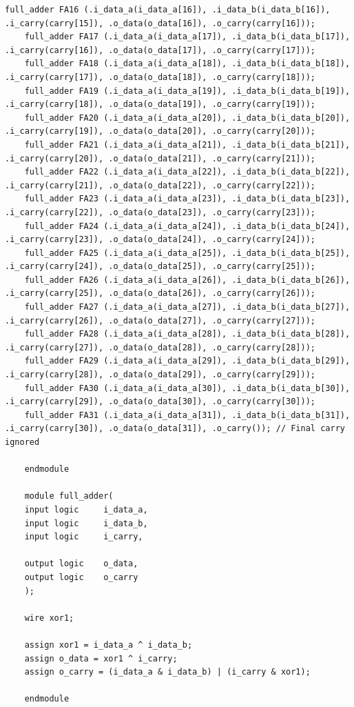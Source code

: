 \begin{lstlisting}[style = SystemVerilog, caption={RCA}]
	full_adder FA16 (.i_data_a(i_data_a[16]), .i_data_b(i_data_b[16]), .i_carry(carry[15]), .o_data(o_data[16]), .o_carry(carry[16]));
	full_adder FA17 (.i_data_a(i_data_a[17]), .i_data_b(i_data_b[17]), .i_carry(carry[16]), .o_data(o_data[17]), .o_carry(carry[17]));
	full_adder FA18 (.i_data_a(i_data_a[18]), .i_data_b(i_data_b[18]), .i_carry(carry[17]), .o_data(o_data[18]), .o_carry(carry[18]));
	full_adder FA19 (.i_data_a(i_data_a[19]), .i_data_b(i_data_b[19]), .i_carry(carry[18]), .o_data(o_data[19]), .o_carry(carry[19]));
	full_adder FA20 (.i_data_a(i_data_a[20]), .i_data_b(i_data_b[20]), .i_carry(carry[19]), .o_data(o_data[20]), .o_carry(carry[20]));
	full_adder FA21 (.i_data_a(i_data_a[21]), .i_data_b(i_data_b[21]), .i_carry(carry[20]), .o_data(o_data[21]), .o_carry(carry[21]));
	full_adder FA22 (.i_data_a(i_data_a[22]), .i_data_b(i_data_b[22]), .i_carry(carry[21]), .o_data(o_data[22]), .o_carry(carry[22]));
	full_adder FA23 (.i_data_a(i_data_a[23]), .i_data_b(i_data_b[23]), .i_carry(carry[22]), .o_data(o_data[23]), .o_carry(carry[23]));
	full_adder FA24 (.i_data_a(i_data_a[24]), .i_data_b(i_data_b[24]), .i_carry(carry[23]), .o_data(o_data[24]), .o_carry(carry[24]));
	full_adder FA25 (.i_data_a(i_data_a[25]), .i_data_b(i_data_b[25]), .i_carry(carry[24]), .o_data(o_data[25]), .o_carry(carry[25]));
	full_adder FA26 (.i_data_a(i_data_a[26]), .i_data_b(i_data_b[26]), .i_carry(carry[25]), .o_data(o_data[26]), .o_carry(carry[26]));
	full_adder FA27 (.i_data_a(i_data_a[27]), .i_data_b(i_data_b[27]), .i_carry(carry[26]), .o_data(o_data[27]), .o_carry(carry[27]));
	full_adder FA28 (.i_data_a(i_data_a[28]), .i_data_b(i_data_b[28]), .i_carry(carry[27]), .o_data(o_data[28]), .o_carry(carry[28]));
	full_adder FA29 (.i_data_a(i_data_a[29]), .i_data_b(i_data_b[29]), .i_carry(carry[28]), .o_data(o_data[29]), .o_carry(carry[29]));
	full_adder FA30 (.i_data_a(i_data_a[30]), .i_data_b(i_data_b[30]), .i_carry(carry[29]), .o_data(o_data[30]), .o_carry(carry[30]));
	full_adder FA31 (.i_data_a(i_data_a[31]), .i_data_b(i_data_b[31]), .i_carry(carry[30]), .o_data(o_data[31]), .o_carry()); // Final carry ignored
	
	endmodule
	
	module full_adder(
	input logic     i_data_a,
	input logic     i_data_b,
	input logic     i_carry,
	
	output logic    o_data,
	output logic    o_carry
	);
	
	wire xor1;
	
	assign xor1 = i_data_a ^ i_data_b;
	assign o_data = xor1 ^ i_carry;
	assign o_carry = (i_data_a & i_data_b) | (i_carry & xor1);
	
	endmodule
\end{lstlisting}

